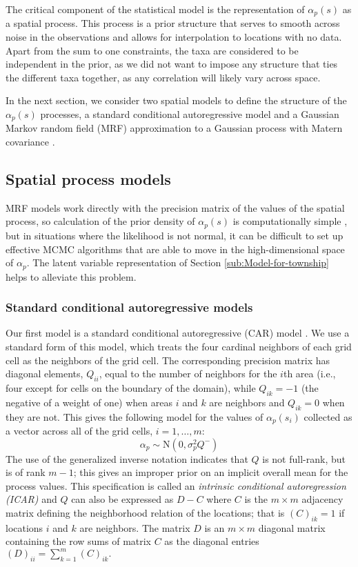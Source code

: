 \documentclass[12pt]{article}\usepackage[]{graphicx}\usepackage[]{color}
\begin{document}
The critical component of the statistical model is the representation
of $\alpha_{p}(s)$ as a spatial process. This process is a prior
structure that serves to smooth across noise in the observations and
allows for interpolation to locations with no data. Apart from the
sum to one constraints, the taxa are considered to be independent
in the prior, as we did not want to impose any structure that ties
the different taxa together, as any correlation will likely vary across
space.

In the next section, we consider two spatial models to define the
structure of the $\alpha_{p}(s)$ processes, a standard conditional
autoregressive model \citep{Bane:etal:2003} and a Gaussian Markov
random field (MRF) approximation to a Gaussian process with Matern
covariance \citep{Lind:etal:2011}. 


\subsection{Spatial process models}

MRF models work directly with the precision matrix of the values of
the spatial process, so calculation of the prior density of $\alpha_{p}(s)$
is computationally simple \citep{Rue:Held:2005}, but in situations
where the likelihood is not normal, it can be difficult to set up
effective MCMC algorithms that are able to move in the high-dimensional
space of $\alpha_{p}$. The latent variable representation of Section
\ref{sub:Model-for-township} helps to alleviate this problem.


\subsubsection{Standard conditional autoregressive models}

Our first model is a standard conditional autoregressive (CAR) model
\citep{Bane:etal:2003}. We use a standard form of this model, which
treats the four cardinal neighbors of each grid cell as the neighbors
of the grid cell. The corresponding precision matrix has diagonal
elements, $Q_{ii}$, equal to the number of neighbors for the $i$th
area (i.e., four except for cells on the boundary of the domain),
while $Q_{ik}=-1$ (the negative of a weight of one) when areas $i$
and $k$ are neighbors and $Q_{ik}=0$ when they are not. This gives
the following model for the values of $\alpha_{p}(s_{i})$ collected
as a vector across all of the grid cells, $i=1,\ldots,m$: 
\[
\alpha_{p}\sim\mbox{N}(0,\sigma_{p}^{2}Q^{-})
\]
The use of the generalized inverse notation indicates that $Q$ is
not full-rank, but is of rank $m-1$; this gives an improper prior
on an implicit overall mean for the process values. This specification
is called an \textit{intrinsic conditional autoregression (ICAR)}
and $Q$ can also be expressed as $D-C$ where $C$ is the $m\times m$
adjacency matrix defining the neighborhood relation of the locations;
that is $(C)_{ik}=1$ if locations $i$ and $k$ are neighbors. The
matrix $D$ is an $m\times m$ diagonal matrix containing the row
sums of matrix $C$ as the diagonal entries $(D)_{ii}={\displaystyle \sum_{k=1}^{m}(C)_{ik}}.$
\end{document}

